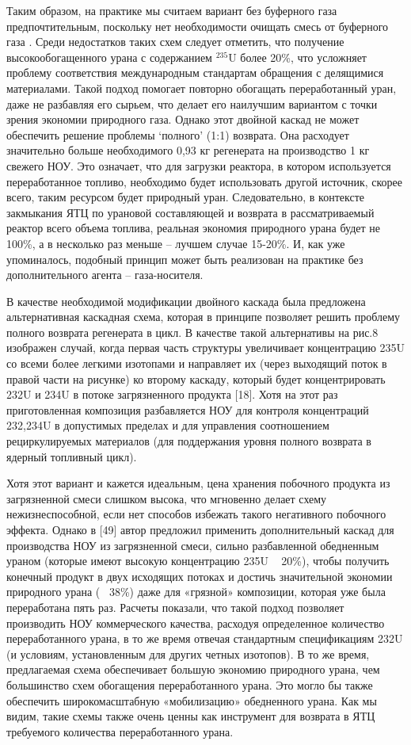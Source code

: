 Таким образом, на практике мы считаем вариант без буферного газа предпочтительным, поскольку нет необходимости очищать смесь от буферного газа \cite{rnovKaskadnyeShemyZadachah2012}. Среди недостатков таких схем следует отметить, что получение высокообогащенного урана с содержанием $^{235}$U более 20\%, что усложняет проблему соответствия международным стандартам обращения с делящимися материалами.
Такой подход помогает повторно обогащать переработанный уран, даже не разбавляя его сырьем, что делает его наилучшим вариантом с точки зрения экономии природного газа. Однако этот двойной каскад не может обеспечить решение проблемы `полного' (1:1) возврата. Она расходует значительно больше необходимого 0,93 кг регенерата на производство 1 кг свежего НОУ. Это означает, что для загрузки реактора, в котором используется переработанное топливо, необходимо будет использовать другой источник, скорее всего, таким ресурсом будет природный уран. Следовательно, в контексте закмыкания ЯТЦ по урановой составляющей и возврата в рассматриваемый реактор всего объема топлива, реальная экономия природного урана будет не 100\%, а в несколько раз меньше -- лучшем случае 15-20\%. И, как уже упоминалось, подобный принцип может быть реализован на практике без дополнительного агента -- газа-носителя.

В качестве необходимой модификации двойного каскада была предложена альтернативная каскадная схема, которая в принципе позволяет решить проблему полного возврата регенерата в цикл. В качестве такой альтернативы на рис.8 изображен случай, когда первая часть структуры увеличивает концентрацию 235U со всеми более легкими изотопами и направляет их (через выходящий поток в правой части на рисунке) ко второму каскаду, который будет концентрировать 232U и 234U в потоке загрязненного продукта [18]. Хотя на этот раз приготовленная композиция разбавляется НОУ для контроля концентраций 232,234U в допустимых пределах и для управления соотношением рециркулируемых материалов (для поддержания уровня полного возврата в ядерный топливный цикл).

Хотя этот вариант и кажется идеальным, цена хранения побочного продукта из загрязненной смеси слишком высока, что мгновенно делает схему нежизнеспособной, если нет способов избежать такого негативного побочного эффекта.
Однако в [49] автор предложил применить дополнительный каскад для производства НОУ из загрязненной смеси, сильно разбавленной обедненным ураном (которые имеют высокую концентрацию 235U ~ 20\%), чтобы получить конечный продукт в двух исходящих потоках и достичь значительной экономии природного урана (~ 38\%) даже для «грязной» композиции, которая уже была переработана пять раз. Расчеты показали, что такой подход позволяет производить НОУ коммерческого качества, расходуя определенное количество переработанного урана, в то же время отвечая стандартным спецификациям 232U (и условиям, установленным для других четных изотопов). В то же время, предлагаемая схема обеспечивает большую экономию природного урана, чем большинство схем обогащения переработанного урана. Это могло бы также обеспечить широкомасштабную «мобилизацию» обедненного урана.
Как мы видим, такие схемы также очень ценны как инструмент для возврата в ЯТЦ требуемого количества переработанного урана.

